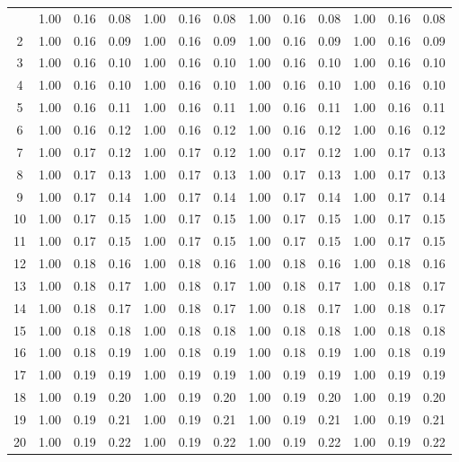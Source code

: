 \begin{center}
\begin{longtable}{|c|c|c|c|c|c|c|c|c|c|c|c|c|}
\hline
\endlastfoot %
 1 & 1.00 & 0.16 & 0.08 & 1.00 & 0.16 & 0.08 & 1.00 & 0.16 & 0.08 & 1.00 & 0.16 & 0.08 \\
 2 & 1.00 & 0.16 & 0.09 & 1.00 & 0.16 & 0.09 & 1.00 & 0.16 & 0.09 & 1.00 & 0.16 & 0.09 \\
 3 & 1.00 & 0.16 & 0.10 & 1.00 & 0.16 & 0.10 & 1.00 & 0.16 & 0.10 & 1.00 & 0.16 & 0.10 \\
 4 & 1.00 & 0.16 & 0.10 & 1.00 & 0.16 & 0.10 & 1.00 & 0.16 & 0.10 & 1.00 & 0.16 & 0.10 \\
 5 & 1.00 & 0.16 & 0.11 & 1.00 & 0.16 & 0.11 & 1.00 & 0.16 & 0.11 & 1.00 & 0.16 & 0.11 \\
 6 & 1.00 & 0.16 & 0.12 & 1.00 & 0.16 & 0.12 & 1.00 & 0.16 & 0.12 & 1.00 & 0.16 & 0.12 \\
 7 & 1.00 & 0.17 & 0.12 & 1.00 & 0.17 & 0.12 & 1.00 & 0.17 & 0.12 & 1.00 & 0.17 & 0.13 \\
 8 & 1.00 & 0.17 & 0.13 & 1.00 & 0.17 & 0.13 & 1.00 & 0.17 & 0.13 & 1.00 & 0.17 & 0.13 \\
 9 & 1.00 & 0.17 & 0.14 & 1.00 & 0.17 & 0.14 & 1.00 & 0.17 & 0.14 & 1.00 & 0.17 & 0.14 \\
10 & 1.00 & 0.17 & 0.15 & 1.00 & 0.17 & 0.15 & 1.00 & 0.17 & 0.15 & 1.00 & 0.17 & 0.15 \\
11 & 1.00 & 0.17 & 0.15 & 1.00 & 0.17 & 0.15 & 1.00 & 0.17 & 0.15 & 1.00 & 0.17 & 0.15 \\
12 & 1.00 & 0.18 & 0.16 & 1.00 & 0.18 & 0.16 & 1.00 & 0.18 & 0.16 & 1.00 & 0.18 & 0.16 \\
13 & 1.00 & 0.18 & 0.17 & 1.00 & 0.18 & 0.17 & 1.00 & 0.18 & 0.17 & 1.00 & 0.18 & 0.17 \\
14 & 1.00 & 0.18 & 0.17 & 1.00 & 0.18 & 0.17 & 1.00 & 0.18 & 0.17 & 1.00 & 0.18 & 0.17 \\
15 & 1.00 & 0.18 & 0.18 & 1.00 & 0.18 & 0.18 & 1.00 & 0.18 & 0.18 & 1.00 & 0.18 & 0.18 \\
16 & 1.00 & 0.18 & 0.19 & 1.00 & 0.18 & 0.19 & 1.00 & 0.18 & 0.19 & 1.00 & 0.18 & 0.19 \\
17 & 1.00 & 0.19 & 0.19 & 1.00 & 0.19 & 0.19 & 1.00 & 0.19 & 0.19 & 1.00 & 0.19 & 0.19 \\
18 & 1.00 & 0.19 & 0.20 & 1.00 & 0.19 & 0.20 & 1.00 & 0.19 & 0.20 & 1.00 & 0.19 & 0.20 \\
19 & 1.00 & 0.19 & 0.21 & 1.00 & 0.19 & 0.21 & 1.00 & 0.19 & 0.21 & 1.00 & 0.19 & 0.21 \\
20 & 1.00 & 0.19 & 0.22 & 1.00 & 0.19 & 0.22 & 1.00 & 0.19 & 0.22 & 1.00 & 0.19 & 0.22 \\

\end{longtable}
\end{center}
